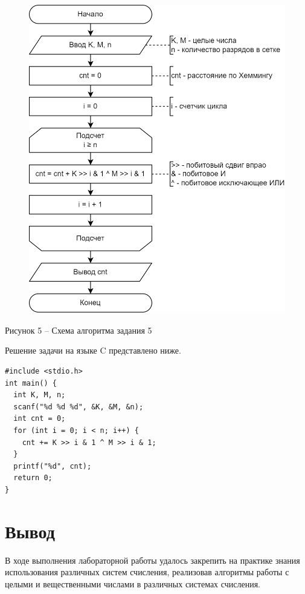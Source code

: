 \documentclass[a4paper,14pt]{extarticle}
\begin{document}
  \begin{figure}[h]
    \centering
    \includegraphics[width=0.6\linewidth]{schemes/s-5}
  \end{figure}
  \begin{center}
    Рисунок 5 – Схема алгоритма задания 5
  \end{center}

  Решение задачи на языке C представлено ниже.

  \begin{lstlisting}[tabsize=2,basicstyle=\ttfamily]
#include <stdio.h>
int main() {
  int K, M, n;
  scanf("%d %d %d", &K, &M, &n);
  int cnt = 0;
  for (int i = 0; i < n; i++) {
    cnt += K >> i & 1 ^ M >> i & 1;
  }
  printf("%d", cnt);
  return 0;
}
  \end{lstlisting}

  \section*{Вывод}
  В ходе выполнения лабораторной работы удалось закрепить на практике знания использования различных систем счисления, реализовав алгоритмы работы с целыми и вещественными числами в различных системах счисления.
\end{document}
